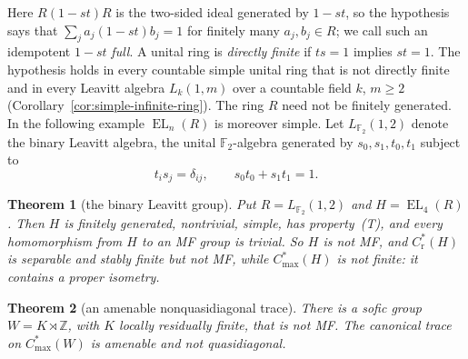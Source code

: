 \documentclass[11pt]{amsart}
\newcommand{\leanverified}[2]{\ignorespaces}
\theoremstyle{plain}
\newtheorem{mainthm}{Theorem}
\newcommand{\F}{\mathbb F}
\newcommand{\EL}{\operatorname{EL}}
\begin{document}
Here $R(1-st)R$ is the two-sided ideal generated by $1-st$, so the
hypothesis says that $\sum_ja_j(1-st)b_j=1$ for finitely many
$a_j,b_j\in R$; we call such an idempotent $1-st$ \emph{full}.  A unital
ring is \emph{directly finite} if $ts=1$ implies $st=1$.  The hypothesis
holds in every countable simple unital ring that is not directly finite
and in every Leavitt algebra $L_k(1,m)$ over a countable field $k$,
$m\ge2$ (Corollary~\ref{cor:simple-infinite-ring}).  The ring $R$ need
not be finitely generated.  In the following example $\EL_n(R)$ is
moreover simple.  Let $L_{\F_2}(1,2)$ denote the binary
Leavitt algebra, the unital $\F_2$-algebra generated by
$s_0,s_1,t_0,t_1$ subject to
\begin{equation}\label{eq:leavitt}
 t_i s_j=\delta_{ij},
 \qquad s_0t_0+s_1t_1=1.
\end{equation}

\begin{mainthm}[the binary Leavitt group]\label{thm:headline}
Put $R=L_{\F_2}(1,2)$ and $H=\EL_4(R)$.  Then $H$ is finitely
generated, nontrivial, simple, has property~\textup{(T)}, and every
homomorphism from $H$ to an MF group is trivial.  So $H$ is not MF, and
$C^*_{\mathrm r}(H)$ is separable and stably finite but not MF, while
$C^*_{\max}(H)$ is not finite: it contains a proper isometry.
\leanverified{Manuscript/OneSidedMFRadical/ReducedCStarConsequence}{GroupApproximation.Manuscript.OneSidedMFRadical.manuscriptPrintedHeadline}
\leanverified{Manuscript/OneSidedMFRadical/HeadlineTheorem}{GroupApproximation.Manuscript.OneSidedMFRadical.manuscriptBinaryLeavittHeadline}
\leanverified{Manuscript/OneSidedMFRadical/ReducedCStarConsequence}{GroupApproximation.Manuscript.OneSidedMFRadical.manuscriptReducedCStarConsequence}
\leanverified{Manuscript/OneSidedMFRadical/ReducedCStarConsequence}{GroupApproximation.Manuscript.OneSidedMFRadical.manuscriptNotEverySeparableStablyFiniteCStarAlgebraIsMF}
\end{mainthm}

\begin{mainthm}[an amenable nonquasidiagonal trace]
\label{thm:amenable-trace}
There is a sofic group $W=K\rtimes\mathbb Z$, with $K$ locally residually
finite, that is not MF\@.  The canonical trace on $C^*_{\max}(W)$ is
amenable and not quasidiagonal.
\end{mainthm}
\end{document}
